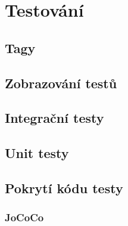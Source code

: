 \chapter{Testování}\label{testovani}

\section{Tagy}\label{testovani:tagy}
\section{Zobrazování testů}\label{testovani:zobrazovani}
\section{Integrační testy}\label{testovani:intergacni}
\section{Unit testy}\label{testovani:unit}
\section{Pokrytí kódu testy}\label{testovani:pokryti}
    \subsection{JoCoCo}
    \cite{JoCoCo}
